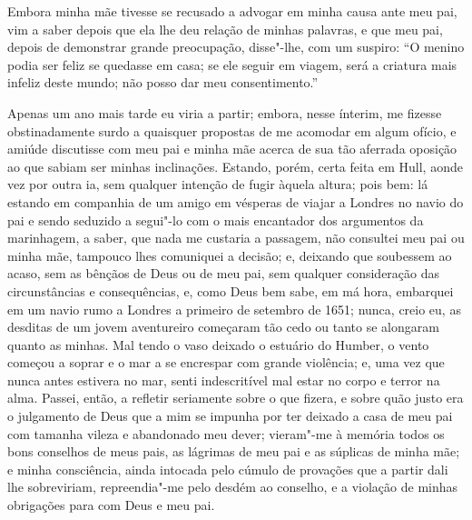 Embora minha mãe tivesse se recusado a advogar em minha causa ante meu
pai, vim a saber depois que ela lhe deu relação de minhas palavras, e
que meu pai, depois de demonstrar grande preocupação, disse"-lhe, com um
suspiro: ``O menino podia ser feliz se quedasse em casa; se ele seguir
em viagem, será a criatura mais infeliz deste mundo; não posso dar meu
consentimento.''

Apenas um ano mais tarde eu viria a partir; embora, nesse ínterim, me
fizesse obstinadamente surdo a quaisquer propostas de me acomodar em
algum ofício, e amiúde discutisse com meu pai e minha mãe acerca de sua
tão aferrada oposição ao que sabiam ser minhas inclinações. Estando,
porém, certa feita em Hull, aonde vez por outra ia, sem qualquer
intenção de fugir àquela altura; pois bem: lá estando em companhia de um
amigo em vésperas de viajar a Londres no navio do pai e sendo seduzido a
segui"-lo com o mais encantador dos argumentos da marinhagem, a saber,
que nada me custaria a passagem, não consultei meu pai ou minha mãe,
tampouco lhes comuniquei a decisão; e, deixando que soubessem ao acaso,
sem as bênçãos de Deus ou de meu pai, sem qualquer consideração das
circunstâncias e consequências, e, como Deus bem sabe, em má hora,
embarquei em um navio rumo a Londres a primeiro de setembro de 1651;
nunca, creio eu, as desditas de um jovem aventureiro começaram tão cedo
ou tanto se alongaram quanto as minhas. Mal tendo o vaso deixado o
estuário do Humber, o vento começou a soprar e o mar a se encrespar com
grande violência; e, uma vez que nunca antes estivera no mar, senti
indescritível mal estar no corpo e terror na alma. Passei, então, a
refletir seriamente sobre o que fizera, e sobre quão justo era o
julgamento de Deus que a mim se impunha por ter deixado a casa de meu
pai com tamanha vileza e abandonado meu dever; vieram"-me à memória todos
os bons conselhos de meus pais, as lágrimas de meu pai e as súplicas de
minha mãe; e minha consciência, ainda intocada pelo cúmulo de provações
que a partir dali lhe sobreviriam, repreendia"-me pelo desdém ao
conselho, e a violação de minhas obrigações para com Deus e meu pai.

